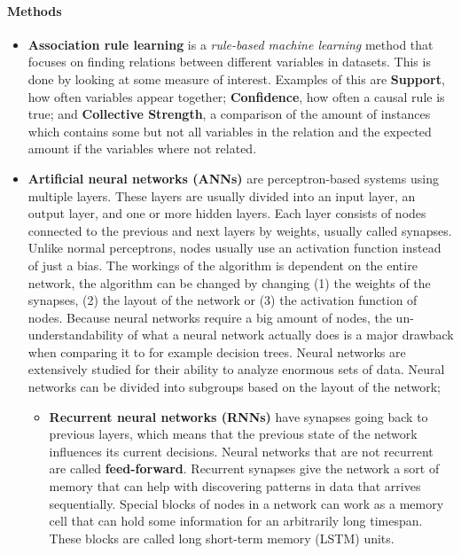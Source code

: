 \paragraph{Methods}
\begin{itemize}
	\item \textbf{Association rule learning}
		is a \textit{rule-based machine learning} method that focuses on finding relations between different variables in datasets. This is done by looking at some measure of interest. Examples of this are \textbf{Support}, how often variables appear together; \textbf{Confidence}, how often a causal rule is true; and \textbf{Collective Strength}, a comparison of the amount of instances which contains some but not all variables in the relation and the expected amount if the variables where not related.
	\item \textbf{Artificial neural networks (ANNs)}
		are perceptron-based systems using multiple layers. These layers are usually divided into an input layer, an output layer, and one or more hidden layers. Each layer consists of nodes connected to the previous and next layers by weights, usually called synapses. Unlike normal perceptrons, nodes usually use an activation function instead of just a bias.
		The workings of the algorithm is dependent on the entire network, the algorithm can be changed by changing (1) the weights of the synapses, (2) the layout of the network or (3) the activation function of nodes.
		Because neural networks require a big amount of nodes, the un-understandability of what a neural network actually does is a major drawback when comparing it to for example decision trees.
		Neural networks are extensively studied for their ability to analyze enormous sets of data. Neural networks can be divided into subgroups based on the layout of the network;
		\begin{itemize}
			\item \textbf{Recurrent neural networks (RNNs)}
				have synapses going back to previous layers, which means that the previous state of the network influences its current decisions. Neural networks that are not recurrent are called \textbf{feed-forward}. Recurrent synapses give the network a sort of memory that can help with discovering patterns in data that arrives sequentially. Special blocks of nodes in a network can work as a memory cell that can hold some information for an arbitrarily long timespan. These blocks are called long short-term memory (LSTM) units.

\end{itemize}
\end{itemize}
